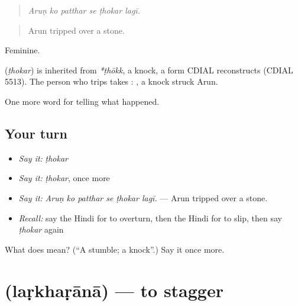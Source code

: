 \begin{quote}
     
\end{quote}

\begin{quote}
\emph{Aruṇ ko patthar se ṭhokar lagī.}
\end{quote}

\begin{quote}
Arun tripped over a stone.
\end{quote}

Feminine.

\begin{cousinweb}
\textbf{} (\emph{ṭhokar}) is inherited from \emph{*ṭhōkk}, a knock, a form CDIAL reconstructs (CDIAL 5513). The person who trips takes \textbf{}: \textbf{   }, a knock struck Arun.
\end{cousinweb}

\begin{grammarlens}[title={What you've built}]
One more word for telling what happened.
\end{grammarlens}

\subsection*{Your turn}
\begin{itemize}
\raggedright
  \item \emph{Say it:} \emph{ṭhokar}
  \item \emph{Say it:} \emph{ṭhokar}, once more
  \item \emph{Say it:} \emph{Aruṇ ko patthar se ṭhokar lagī.} — Arun tripped over a stone.
  \item \emph{Recall:} say the Hindi for to overturn, then the Hindi for to slip, then say \emph{ṭhokar} again
\end{itemize}

\begin{tcolorbox}[breakable,colback=teal!4,colframe=teal!35!black,title={Before you move on}]
What does  mean? (\textquotedblleft{}A stumble; a knock\textquotedblright{}.) Say it once more.
\end{tcolorbox}
\section[\texorpdfstring{\hi{लड़खड़ाना} (laṛkhaṛānā)}{लड़खड़ाना (laṛkhaṛānā)}]{ (laṛkhaṛānā) — to stagger}

